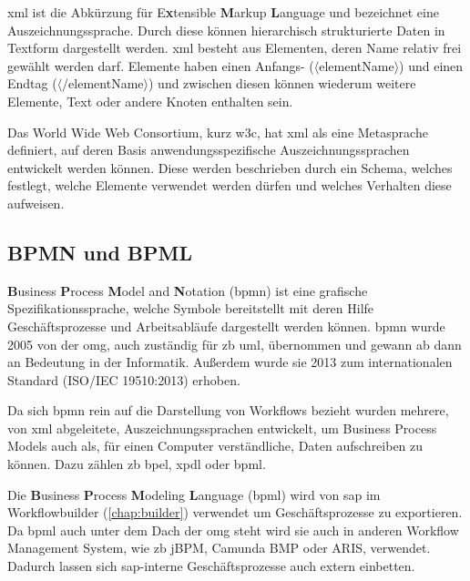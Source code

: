 \gls{xml} ist die Abkürzung für E\textbf{x}tensible \textbf{M}arkup \textbf{L}anguage und bezeichnet eine Auszeichnungssprache. Durch diese können hierarchisch strukturierte Daten in Textform dargestellt werden. \gls{xml} besteht aus Elementen, deren Name relativ frei gewählt werden darf. Elemente haben einen Anfangs- ($\langle$elementName$\rangle$) und einen Endtag ($\langle$/elementName$\rangle$) und zwischen diesen können wiederum weitere Elemente, Text oder andere Knoten enthalten sein. 

Das World Wide Web Consortium, kurz \gls{w3c}, hat \gls{xml} als eine Metasprache definiert, auf deren Basis anwendungsspezifische Auszeichnungssprachen entwickelt werden können. Diese werden beschrieben durch ein Schema, welches festlegt, welche Elemente verwendet werden dürfen und welches Verhalten diese aufweisen.\cite{XML}

\subsection{BPMN und BPML}
\label{sec:export-bpmn-bpml}

\textbf{B}usiness \textbf{P}rocess \textbf{M}odel and \textbf{N}otation (\gls{bpmn}) ist eine grafische Spezifikationssprache, welche Symbole bereitstellt mit deren Hilfe Geschäftsprozesse und Arbeitsabläufe dargestellt werden können.\cite{BPMN} \gls{bpmn} wurde 2005 von der \gls{omg}, auch zuständig für \gls{zb} \gls{uml}, übernommen und gewann ab dann an Bedeutung in der Informatik. Außerdem wurde sie 2013 zum internationalen Standard (ISO/IEC 19510:2013) erhoben.\cite{OMG}

Da sich \gls{bpmn} rein auf die Darstellung von Workflows bezieht wurden mehrere, von \gls{xml} abgeleitete, Auszeichnungssprachen entwickelt, um Business Process Models auch als, für einen Computer verständliche, Daten aufschreiben zu können. Dazu zählen \gls{zb} \gls{bpel}, \gls{xpdl} oder \gls{bpml}.\cite{BPMN}

Die \textbf{B}usiness \textbf{P}rocess \textbf{M}odeling \textbf{L}anguage (\gls{bpml}) wird von \gls{sap} im Workflowbuilder (\ref{chap:builder}) verwendet um Geschäftsprozesse zu exportieren. Da \gls{bpml} auch unter dem Dach der \gls{omg} steht wird sie auch in anderen Workflow Management System, wie \gls{zb} jBPM, Camunda BMP oder ARIS, verwendet. Dadurch lassen sich \gls{sap}-interne Geschäftsprozesse auch extern einbetten.\cite{BPML}